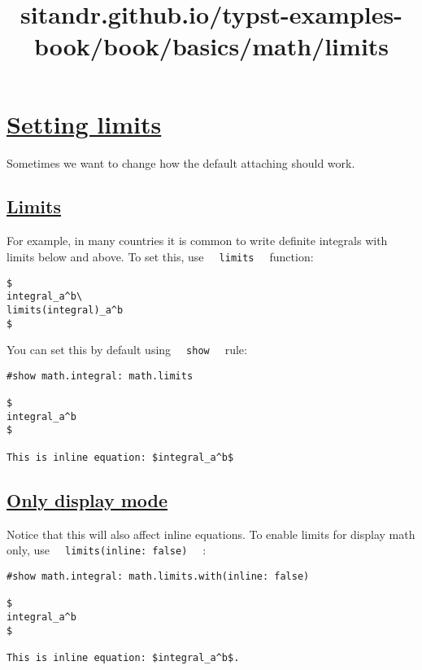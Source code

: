 \title{sitandr.github.io/typst-examples-book/book/basics/math/limits}

\section{\texorpdfstring{\hyperref[setting-limits]{Setting
limits}}{Setting limits}}\label{setting-limits}

Sometimes we want to change how the default attaching should work.

\subsection{\texorpdfstring{\hyperref[limits]{Limits}}{Limits}}\label{limits}

For example, in many countries it is common to write definite integrals
with limits below and above. To set this, use
\texttt{\ }{\texttt{\ limits\ }}\texttt{\ } function:

\begin{verbatim}
$
integral_a^b\
limits(integral)_a^b
$
\end{verbatim}

\pandocbounded{}

You can set this by default using
\texttt{\ }{\texttt{\ show\ }}\texttt{\ } rule:

\begin{verbatim}
#show math.integral: math.limits

$
integral_a^b
$

This is inline equation: $integral_a^b$
\end{verbatim}

\pandocbounded{}

\subsection{\texorpdfstring{\hyperref[only-display-mode]{Only display
mode}}{Only display mode}}\label{only-display-mode}

Notice that this will also affect inline equations. To enable limits for
display math only, use
\texttt{\ }{\texttt{\ limits(inline:\ false)\ }}\texttt{\ } :

\begin{verbatim}
#show math.integral: math.limits.with(inline: false)

$
integral_a^b
$

This is inline equation: $integral_a^b$.
\end{verbatim}

